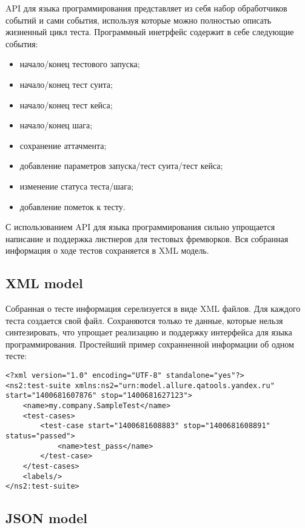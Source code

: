API для языка программирования представляет из себя набор обработчиков событий и сами события, используя которые можно полностью описать жизненный цикл теста. Программный инетрфейс содержит в себе следующие события:

\begin{itemize}
\item начало/конец тестового запуска;
\item начало/конец тест суита;
\item начало/конец тест кейса;
\item начало/конец шага;
\item сохранение аттачмента;
\item добавление параметров запуска/тест суита/тест кейса;
\item изменение статуса теста/шага;
\item добавление пометок к тесту.
\end{itemize}

С использованием API для языка программирования сильно упрощается написание и поддержка листнеров для тестовых фремворков. Вся собранная информация о ходе тестов сохраняется в XML модель. 

\newpage
\subsection{XML model}

Собранная о тесте информация серелизуется в виде XML файлов. Для каждого теста создается свой файл. Сохраняются только те данные, которые нельзя синтезировать, что упрощает реализацию и поддержку интерфейса для языка программирования. Простейший пример сохранненной информации об одном тесте:

\begin{lstlisting}[style=XML, caption=Пример простой XML-модели]
<?xml version="1.0" encoding="UTF-8" standalone="yes"?>
<ns2:test-suite xmlns:ns2="urn:model.allure.qatools.yandex.ru" start="1400681607876" stop="1400681627123">
    <name>my.company.SampleTest</name>
    <test-cases>
        <test-case start="1400681608883" stop="1400681608891" status="passed">
            <name>test_pass</name>
        </test-case>
    </test-cases>
    <labels/>
</ns2:test-suite>
\end{lstlisting}

\subsection{JSON model}

